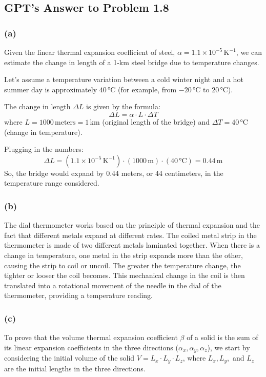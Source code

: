 \documentclass[12pt]{article}
\begin{document}
\subsection*{GPT's Answer to Problem 1.8}

\subsubsection*{(a)}
Given the linear thermal expansion coefficient of steel, $\alpha = 1.1 \times 10^{-5} \, \mathrm{K}^{-1}$, we can estimate the change in length of a 1-km steel bridge due to temperature changes. 

Let's assume a temperature variation between a cold winter night and a hot summer day is approximately $40 \, \si{\degreeCelsius}$ (for example, from $-20 \, \si{\degreeCelsius}$ to $20 \, \si{\degreeCelsius}$). 

The change in length $\Delta L$ is given by the formula:
\[
\Delta L = \alpha \cdot L \cdot \Delta T
\]
where $L = 1000 \, \text{meters} = 1 \, \text{km}$ (original length of the bridge) and $\Delta T = 40 \, \si{\degreeCelsius}$ (change in temperature).

Plugging in the numbers:
\[
\Delta L = (1.1 \times 10^{-5} \, \mathrm{K}^{-1}) \cdot (1000 \, \text{m}) \cdot (40 \, \si{\degreeCelsius}) = 0.44 \, \text{m}
\]
So, the bridge would expand by 0.44 meters, or 44 centimeters, in the temperature range considered.

\subsubsection*{(b)}
The dial thermometer works based on the principle of thermal expansion and the fact that different metals expand at different rates. The coiled metal strip in the thermometer is made of two different metals laminated together. When there is a change in temperature, one metal in the strip expands more than the other, causing the strip to coil or uncoil. The greater the temperature change, the tighter or looser the coil becomes. This mechanical change in the coil is then translated into a rotational movement of the needle in the dial of the thermometer, providing a temperature reading.

\subsubsection*{(c)}
To prove that the volume thermal expansion coefficient $\beta$ of a solid is the sum of its linear expansion coefficients in the three directions ($\alpha_x, \alpha_y, \alpha_z$), we start by considering the initial volume of the solid $V = L_x \cdot L_y \cdot L_z$, where $L_x, L_y,$ and $L_z$ are the initial lengths in the three directions.
\end{document}
